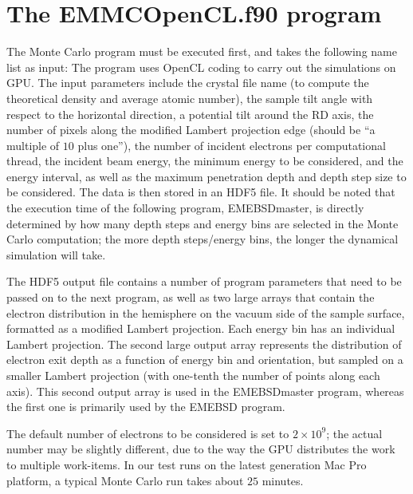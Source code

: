 \documentclass[DIV=calc, paper=letter, fontsize=11pt]{scrartcl}	 %
\begin{document}
\section{The \protect\textsf{EMMCOpenCL.f90} program\label{sec:f90MC}}
The Monte Carlo program must be executed first, and takes the following name list as input:
The program uses OpenCL coding to carry out the simulations on GPU.  The input parameters
include the crystal file name (to compute the theoretical density and average atomic number), the sample
tilt angle with respect to the horizontal direction, a potential tilt around the \textsf{RD} axis, the number of pixels
along the modified Lambert projection edge (should be ``a multiple of $10$ plus one''), the number of incident electrons per computational thread, 
the incident beam energy, the minimum energy to be considered, and the energy interval,
as well as the maximum penetration depth and depth step size to be considered.  The data is then stored in an 
HDF5 file.  It should be noted that the execution time of the 
following program, \textsf{EMEBSDmaster}, is directly determined by how many depth steps and energy bins are selected in the
Monte Carlo computation; the more depth steps/energy bins, the longer the dynamical simulation will take.
%

The HDF5 output file contains a number of program parameters
that need to be passed on to the next program, as well as two large arrays that contain the electron distribution in the hemisphere on
the vacuum side of the sample surface, formatted as a modified Lambert projection.  Each energy bin has an individual Lambert 
projection.  The second large output array represents the distribution of electron exit depth as a function of energy bin and
orientation, but sampled on a smaller Lambert projection (with one-tenth the number of points along each axis).  This second output
array is used in the \textsf{EMEBSDmaster} program, whereas the first one is primarily used by the \textsf{EMEBSD} program.

The default number of electrons to be considered is set to $2\times 10^9$; the actual number may be slightly different, due 
to the way the GPU distributes the work to multiple work-items.  In our test runs on the latest generation Mac Pro platform, 
a typical Monte Carlo run takes about $25$ minutes.
\end{document}
